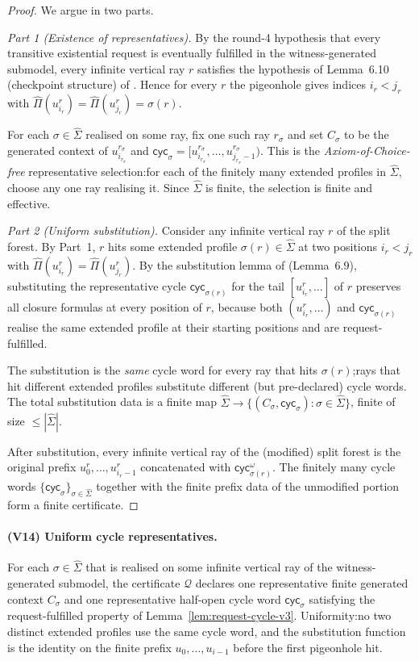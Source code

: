 \documentclass[11pt]{article}
\theoremstyle{definition}
\theoremstyle{remark}
\newcommand{\Q}{\mathcal{Q}}
\newcommand{\extProf}{\widehat\Pi}
\newcommand{\extSigma}{\widehat\Sigma}
\begin{document}
\begin{proof}
We argue in two parts.

\emph{Part 1 (Existence of representatives).}  By the round-4
hypothesis that every transitive existential request is eventually
fulfilled in the witness-generated submodel, every infinite
vertical ray $r$ satisfies the hypothesis of Lemma~6.10 (checkpoint
structure) of \cite{GPT55Repaired}.  Hence for every $r$ the
pigeonhole gives indices $i_r<j_r$ with
$\extProf(u_{i_r}^r)=\extProf(u_{j_r}^r)=\sigma(r)$.

For each $\sigma\in\extSigma$ realised on some ray, fix one such
ray $r_\sigma$ and set $C_\sigma$ to be the generated context of
$u_{i_{r_\sigma}}^{r_\sigma}$ and
$\mathsf{cyc}_\sigma=[u_{i_{r_\sigma}}^{r_\sigma},\ldots,
u_{j_{r_\sigma}-1}^{r_\sigma})$.  This is the
\emph{Axiom-of-Choice-free} representative selection:\@ for each of
the finitely many extended profiles in $\extSigma$, choose any
one ray realising it.  Since $\extSigma$ is finite, the selection
is finite and effective.

\emph{Part 2 (Uniform substitution).}  Consider any infinite
vertical ray $r$ of the split forest.  By Part~1, $r$ hits some
extended profile $\sigma(r)\in\extSigma$ at two positions $i_r<j_r$
with $\extProf(u_{i_r}^r)=\extProf(u_{j_r}^r)$.  By the
substitution lemma of \cite{GPT55Repaired} (Lemma~6.9),
substituting the representative cycle $\mathsf{cyc}_{\sigma(r)}$
for the tail $[u_{i_r}^r,\ldots]$ of $r$ preserves all closure
formulas at every position of $r$, because both
$(u_{i_r}^r,\ldots)$ and $\mathsf{cyc}_{\sigma(r)}$ realise the
same extended profile at their starting positions and are
request-fulfilled.

The substitution is the \emph{same} cycle word for every ray that
hits $\sigma(r)$;\@ rays that hit different extended profiles
substitute different (but pre-declared) cycle words.  The total
substitution data is a finite map
$\extSigma\to\{(C_\sigma,\mathsf{cyc}_\sigma):\sigma\in\extSigma\}$,
finite of size $\leq |\extSigma|$.

After substitution, every infinite vertical ray of the (modified)
split forest is the original prefix
$u_0^r,\ldots,u_{i_r-1}^r$ concatenated with
$\mathsf{cyc}_{\sigma(r)}^\omega$.  The finitely many cycle words
$\{\mathsf{cyc}_\sigma\}_{\sigma\in\extSigma}$ together with the
finite prefix data of the unmodified portion form a finite
certificate.
\end{proof}

\paragraph{(V14) Uniform cycle representatives.}
For each $\sigma\in\extSigma$ that is realised on some infinite
vertical ray of the witness-generated submodel, the certificate
$\Q$ declares one representative finite generated context $C_\sigma$
and one representative half-open cycle word $\mathsf{cyc}_\sigma$
satisfying the request-fulfilled property of
Lemma~\ref{lem:request-cycle-v3}.  Uniformity:\@ no two distinct
extended profiles use the same cycle word, and the substitution
function is the identity on the finite prefix
$u_0,\ldots,u_{i-1}$ before the first pigeonhole hit.
\end{document}
